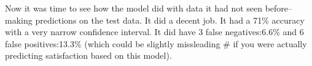 \documentclass[
]{article}
\newenvironment{Shaded}{\begin{snugshade}}{\end{snugshade}}
\newcommand{\CommentTok}[1]{\textcolor[rgb]{0.56,0.35,0.01}{\textit{#1}}}
\newcommand{\DataTypeTok}[1]{\textcolor[rgb]{0.13,0.29,0.53}{#1}}
\newcommand{\KeywordTok}[1]{\textcolor[rgb]{0.13,0.29,0.53}{\textbf{#1}}}
\newcommand{\NormalTok}[1]{#1}
\newcommand{\OperatorTok}[1]{\textcolor[rgb]{0.81,0.36,0.00}{\textbf{#1}}}
\newcommand{\StringTok}[1]{\textcolor[rgb]{0.31,0.60,0.02}{#1}}
\begin{document}
Now it was time to see how the model did with data it had not seen
before-- making predictions on the test data. It did a decent job. It
had a 71\% accuracy with a very narrow confidence interval. It did have
3 false negatives:6.6\% and 6 false positives:13.3\% (which could be
slightly missleading \# if you were actually predicting satisfaction
based on this model).

\begin{Shaded}
\end{Shaded}
\end{document}
